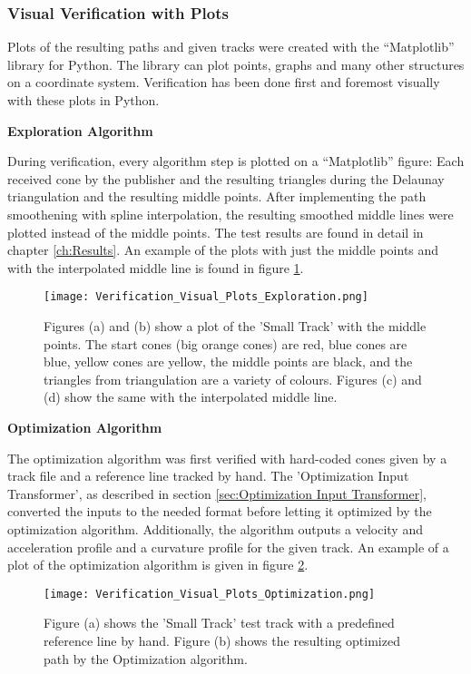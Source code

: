 \subsubsection{Visual Verification with Plots} \label{sec:Visual Verification with Plots}
Plots of the resulting paths and given tracks were created with the ``Matplotlib'' library for Python. The library can plot points, graphs and many other structures on a coordinate system. Verification has been done first and foremost visually with these plots in Python.

\textbf{Exploration Algorithm}

During verification, every algorithm step is plotted on a ``Matplotlib'' figure: Each received cone by the publisher and the resulting triangles during the Delaunay triangulation and the resulting middle points. After implementing the path smoothening with spline interpolation, the resulting smoothed middle lines were plotted instead of the middle points. The test results are found in detail in chapter \ref{ch:Results}. An example of the plots with just the middle points and with the interpolated middle line is found in figure \ref{fig:Verification Visual Plots Exploration}.

\begin{figure}[H]
    \centering
    \texttt{[image: Verification\_Visual\_Plots\_Exploration.png]}
    \caption{Figures (a) and (b) show a plot of the 'Small Track' with the middle points. The start cones (big orange cones) are red, blue cones are blue, yellow cones are yellow, the middle points are black, and the triangles from triangulation are a variety of colours. Figures (c) and (d) show the same with the interpolated middle line.}
    \label{fig:Verification Visual Plots Exploration}
\end{figure}

\textbf{Optimization Algorithm}

The optimization algorithm was first verified with hard-coded cones given by a track file and a reference line tracked by hand. The 'Optimization Input Transformer', as described in section \ref{sec:Optimization Input Transformer}, converted the inputs to the needed format before letting it optimized by the optimization algorithm. Additionally, the algorithm outputs a velocity and acceleration profile and a curvature profile for the given track. An example of a plot of the optimization algorithm is given in figure \ref{fig:Verification Visual Plots Optimization}.

\begin{figure}[H]
    \centering
    \texttt{[image: Verification\_Visual\_Plots\_Optimization.png]}
    \caption{Figure (a) shows the 'Small Track' test track with a predefined reference line by hand. Figure (b) shows the resulting optimized path by the Optimization algorithm.}
    \label{fig:Verification Visual Plots Optimization}
\end{figure}

